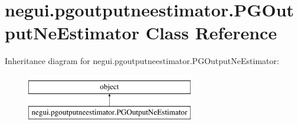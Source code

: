 \hypertarget{classnegui_1_1pgoutputneestimator_1_1PGOutputNeEstimator}{}\section{negui.\+pgoutputneestimator.\+P\+G\+Output\+Ne\+Estimator Class Reference}
\label{classnegui_1_1pgoutputneestimator_1_1PGOutputNeEstimator}
Inheritance diagram for negui.\+pgoutputneestimator.\+P\+G\+Output\+Ne\+Estimator\+:\begin{figure}[H]
\begin{center}
\leavevmode
\includegraphics[height=2.000000cm]{classnegui_1_1pgoutputneestimator_1_1PGOutputNeEstimator}
\end{center}
\end{figure}
